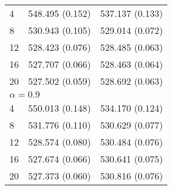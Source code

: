 \begin{table}[htbp]
\begin{center}
\begin{tabular}{lll}
\multicolumn{1}{l|}{4}                 & \multicolumn{1}{l|}{548.495 (0.152)}              & 537.137 (0.133)            \\
\multicolumn{1}{l|}{8}                 & \multicolumn{1}{l|}{530.943 (0.105)}              & 529.014 (0.072)            \\
\multicolumn{1}{l|}{12}                & \multicolumn{1}{l|}{528.423 (0.076)}              & 528.485 (0.063)            \\
\multicolumn{1}{l|}{16}                & \multicolumn{1}{l|}{527.707 (0.066)}              & 528.463 (0.064)            \\
\multicolumn{1}{l|}{20}                & \multicolumn{1}{l|}{527.502 (0.059)}              & 528.692 (0.063)            \\ \hline
\multicolumn{3}{l}{$\alpha = 0.9$}                                                                                         \\ \hline
\multicolumn{1}{l|}{4}                 & \multicolumn{1}{l|}{550.013 (0.148)}              & 534.170 (0.124)            \\
\multicolumn{1}{l|}{8}                 & \multicolumn{1}{l|}{531.776 (0.110)}              & 530.629 (0.077)            \\
\multicolumn{1}{l|}{12}                & \multicolumn{1}{l|}{528.574 (0.080)}              & 530.484 (0.076)            \\
\multicolumn{1}{l|}{16}                & \multicolumn{1}{l|}{527.674 (0.066)}              & 530.641 (0.075)            \\
\multicolumn{1}{l|}{20}                & \multicolumn{1}{l|}{527.373 (0.060)}              & 530.816 (0.076)           
\end{tabular}
\end{center}
\end{table}